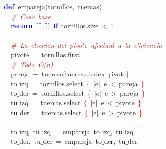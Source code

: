 \noindent
\mbox{}\textbf{\textcolor{Blue}{def}}\ empareja\textcolor{BrickRed}{(}tornillos\textcolor{BrickRed}{,}\ tuercas\textcolor{BrickRed}{)} \\
\mbox{}\ \ \textit{\textcolor{Brown}{\#\ Caso\ base}} \\
\mbox{}\ \ \textbf{\textcolor{Blue}{return}}\ \textcolor{BrickRed}{[[],[]]}\ \textbf{\textcolor{Blue}{if}}\ tornillos\textcolor{BrickRed}{.}size\ \textcolor{BrickRed}{\textless{}}\ \textcolor{Purple}{1} \\
\mbox{} \\
\mbox{}\ \ \textit{\textcolor{Brown}{\#\ La\ elección\ del\ pivote\ afectará\ a\ la\ eficiencia}} \\
\mbox{}\ \ pivote\ \textcolor{BrickRed}{=}\ tornillos\textcolor{BrickRed}{.}first \\
\mbox{}\ \ \textit{\textcolor{Brown}{\#\ Todo\ O(n)}} \\
\mbox{}\ \ pareja\ \textcolor{BrickRed}{=}\ tuercas\textcolor{BrickRed}{[}tuercas\textcolor{BrickRed}{.}index\ pivote\textcolor{BrickRed}{]} \\
\mbox{}\ \ to$\_$izq\ \textcolor{BrickRed}{=}\ tornillos\textcolor{BrickRed}{.}select\ \textcolor{Red}{\{}\ \textcolor{BrickRed}{$|$}e\textcolor{BrickRed}{$|$}\ e\ \textcolor{BrickRed}{\textless{}}\ pareja\ \textcolor{Red}{\}} \\
\mbox{}\ \ to$\_$der\ \textcolor{BrickRed}{=}\ tornillos\textcolor{BrickRed}{.}select\ \textcolor{Red}{\{}\ \textcolor{BrickRed}{$|$}e\textcolor{BrickRed}{$|$}\ e\ \textcolor{BrickRed}{\textgreater{}}\ pareja\ \textcolor{Red}{\}} \\
\mbox{}\ \ tu$\_$izq\ \textcolor{BrickRed}{=}\ tuercas\textcolor{BrickRed}{.}select\ \textcolor{Red}{\{}\ \textcolor{BrickRed}{$|$}e\textcolor{BrickRed}{$|$}\ e\ \textcolor{BrickRed}{\textless{}}\ pivote\ \textcolor{Red}{\}} \\
\mbox{}\ \ tu$\_$der\ \textcolor{BrickRed}{=}\ tuercas\textcolor{BrickRed}{.}select\ \textcolor{Red}{\{}\ \textcolor{BrickRed}{$|$}e\textcolor{BrickRed}{$|$}\ e\ \textcolor{BrickRed}{\textgreater{}}\ pivote\ \textcolor{Red}{\}} \\
\mbox{} \\
\mbox{}\ \ to$\_$izq\textcolor{BrickRed}{,}\ tu$\_$izq\ \textcolor{BrickRed}{=}\ empareja\ to$\_$izq\textcolor{BrickRed}{,}\ tu$\_$izq \\
\mbox{}\ \ to$\_$der\textcolor{BrickRed}{,}\ tu$\_$der\ \textcolor{BrickRed}{=}\ empareja\ to$\_$der\textcolor{BrickRed}{,}\ tu$\_$der \\
